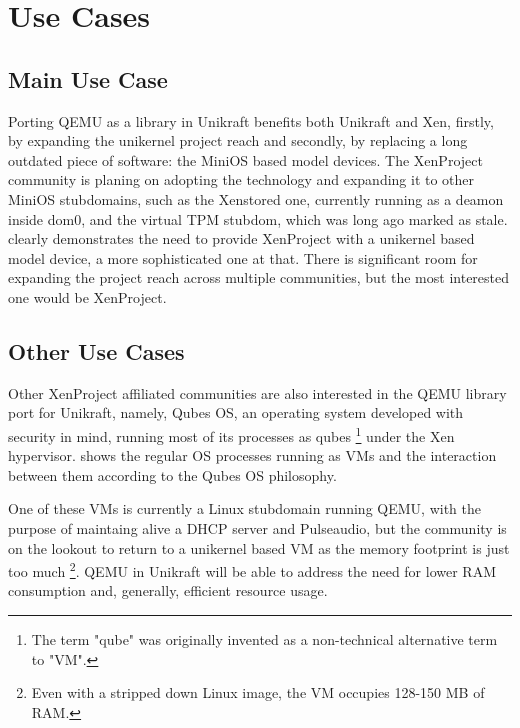 \chapter{Use Cases}
\label{chapter:use-cases}

\section{Main Use Case}
\label{sec:main-use-case}

Porting QEMU as a library in Unikraft benefits both Unikraft and Xen, firstly, by expanding the unikernel project reach and secondly, by replacing a long outdated piece of software: the MiniOS based model devices.
The XenProject community is planing on adopting the technology and expanding it to other MiniOS stubdomains, such as the Xenstored one, currently running as a deamon inside dom0, and the virtual TPM stubdom, which was long ago marked as stale.
 clearly demonstrates the need to provide XenProject with a unikernel based model device, a more sophisticated one at that.
There is significant room for expanding the project reach across multiple communities, but the most interested one would be XenProject.


\section{Other Use Cases}
\label{sec:other-use-cases}

Other XenProject affiliated communities are also interested in the QEMU library port for Unikraft, namely, Qubes OS, an operating system developed with security in mind, running most of its processes as qubes \footnote{The term "qube" was originally invented as a non-technical alternative term to "VM".} under the Xen hypervisor.
 shows the regular OS processes running as VMs and the interaction between them according to the Qubes OS philosophy.


One of these VMs is currently a Linux stubdomain running QEMU, with the purpose of maintaing alive a DHCP server and Pulseaudio, but the community is on the lookout to return to a unikernel based VM as the memory footprint is just too much \footnote{Even with a stripped down Linux image, the VM occupies 128-150 MB of RAM.}.
QEMU in Unikraft will be able to address the need for lower RAM consumption and, generally, efficient resource usage.

